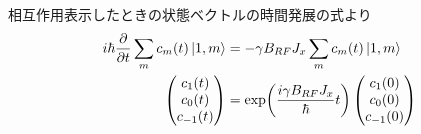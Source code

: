 \documentclass[../ap_2012.tex]{subfiles}
\begin{document}
\section{}
相互作用表示したときの状態ベクトルの時間発展の式より
\begin{equation}\begin{aligned}[b]
    i\hbar\pdv{t}\sum_m c_m(t) \ket{1,m}&=-\gamma B_{RF}J_x\sum_m c_m(t) \ket{1,m}\\
    \begin{pmatrix}
        {c_1(t)}\\
        {c_0(t)}\\
        {c_{-1}(t)}
    \end{pmatrix}
    &=\exp(\frac{i\gamma B_{RF}J_x}{\hbar}t)
    \begin{pmatrix}
        {c_1(0)}\\
        {c_0(0)}\\
        {c_{-1}(0)}
    \end{pmatrix}
\end{aligned}\end{equation}
\end{document}
